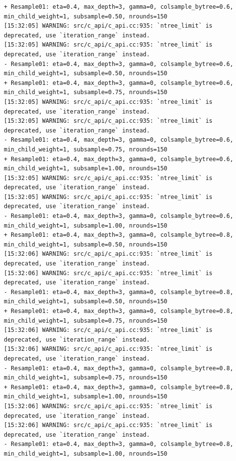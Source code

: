 \documentclass[
  letterpaper,
  DIV=11,
  numbers=noendperiod]{scrartcl}
\begin{document}
\begin{verbatim}
+ Resample01: eta=0.4, max_depth=3, gamma=0, colsample_bytree=0.6, min_child_weight=1, subsample=0.50, nrounds=150 
[15:32:05] WARNING: src/c_api/c_api.cc:935: `ntree_limit` is deprecated, use `iteration_range` instead.
[15:32:05] WARNING: src/c_api/c_api.cc:935: `ntree_limit` is deprecated, use `iteration_range` instead.
- Resample01: eta=0.4, max_depth=3, gamma=0, colsample_bytree=0.6, min_child_weight=1, subsample=0.50, nrounds=150 
+ Resample01: eta=0.4, max_depth=3, gamma=0, colsample_bytree=0.6, min_child_weight=1, subsample=0.75, nrounds=150 
[15:32:05] WARNING: src/c_api/c_api.cc:935: `ntree_limit` is deprecated, use `iteration_range` instead.
[15:32:05] WARNING: src/c_api/c_api.cc:935: `ntree_limit` is deprecated, use `iteration_range` instead.
- Resample01: eta=0.4, max_depth=3, gamma=0, colsample_bytree=0.6, min_child_weight=1, subsample=0.75, nrounds=150 
+ Resample01: eta=0.4, max_depth=3, gamma=0, colsample_bytree=0.6, min_child_weight=1, subsample=1.00, nrounds=150 
[15:32:05] WARNING: src/c_api/c_api.cc:935: `ntree_limit` is deprecated, use `iteration_range` instead.
[15:32:05] WARNING: src/c_api/c_api.cc:935: `ntree_limit` is deprecated, use `iteration_range` instead.
- Resample01: eta=0.4, max_depth=3, gamma=0, colsample_bytree=0.6, min_child_weight=1, subsample=1.00, nrounds=150 
+ Resample01: eta=0.4, max_depth=3, gamma=0, colsample_bytree=0.8, min_child_weight=1, subsample=0.50, nrounds=150 
[15:32:06] WARNING: src/c_api/c_api.cc:935: `ntree_limit` is deprecated, use `iteration_range` instead.
[15:32:06] WARNING: src/c_api/c_api.cc:935: `ntree_limit` is deprecated, use `iteration_range` instead.
- Resample01: eta=0.4, max_depth=3, gamma=0, colsample_bytree=0.8, min_child_weight=1, subsample=0.50, nrounds=150 
+ Resample01: eta=0.4, max_depth=3, gamma=0, colsample_bytree=0.8, min_child_weight=1, subsample=0.75, nrounds=150 
[15:32:06] WARNING: src/c_api/c_api.cc:935: `ntree_limit` is deprecated, use `iteration_range` instead.
[15:32:06] WARNING: src/c_api/c_api.cc:935: `ntree_limit` is deprecated, use `iteration_range` instead.
- Resample01: eta=0.4, max_depth=3, gamma=0, colsample_bytree=0.8, min_child_weight=1, subsample=0.75, nrounds=150 
+ Resample01: eta=0.4, max_depth=3, gamma=0, colsample_bytree=0.8, min_child_weight=1, subsample=1.00, nrounds=150 
[15:32:06] WARNING: src/c_api/c_api.cc:935: `ntree_limit` is deprecated, use `iteration_range` instead.
[15:32:06] WARNING: src/c_api/c_api.cc:935: `ntree_limit` is deprecated, use `iteration_range` instead.
- Resample01: eta=0.4, max_depth=3, gamma=0, colsample_bytree=0.8, min_child_weight=1, subsample=1.00, nrounds=150 

\end{verbatim}
\end{document}
